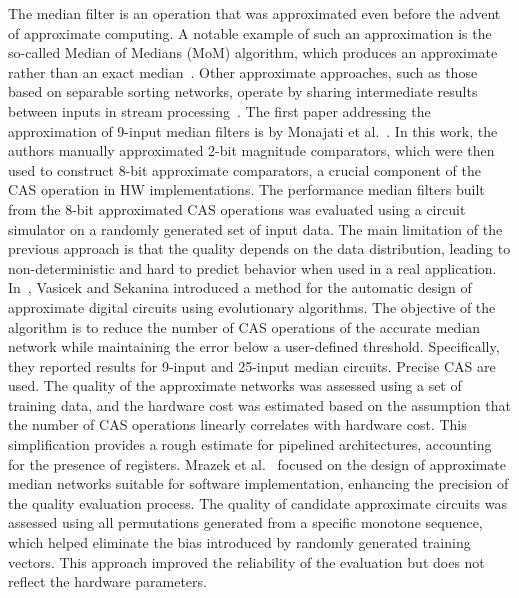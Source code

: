 The median filter is an operation that was approximated even before the advent of approximate computing. A notable example of such an approximation is the so-called Median of Medians (MoM) algorithm, which produces an approximate rather than an exact median~\cite{blum}. %
Other approximate approaches, such as those based on separable sorting networks, operate by sharing intermediate results between inputs in stream processing~\cite{Perrot2022, Adams, salvador18}.
The first paper addressing the approximation of 9-input median filters is by Monajati et al.~\cite{Monajati:2015}. In this work, the authors manually approximated 2-bit magnitude comparators, which were then used to construct 8-bit approximate comparators, a crucial component of the CAS operation in HW implementations. The performance median filters built from the 8-bit approximated CAS operations was evaluated using a circuit simulator on a randomly generated set of input data. 
The main limitation of the previous approach is that the quality depends on the data distribution, leading to non-deterministic and hard to predict behavior when used in a real application. In~\cite{vasicek:sekanina:tec}, Vasicek and Sekanina introduced a method for the automatic design of approximate digital circuits using evolutionary algorithms. The objective of the algorithm is to reduce the number of CAS operations of the accurate median network while maintaining the error below a user-defined threshold. Specifically, they reported results for 9-input and 25-input median circuits. Precise CAS are used. The quality of the approximate networks was assessed using a set of training data, and the hardware cost was estimated based on the assumption that the number of CAS operations linearly correlates with hardware cost. This simplification provides a rough estimate for pipelined architectures, accounting for the presence of registers.
Mrazek et al.~\cite{Vasicek2016} focused on the design of approximate median networks suitable for software implementation, enhancing the precision of the quality evaluation process. The quality of candidate approximate circuits was assessed using all permutations generated from a specific monotone sequence, which helped eliminate the bias introduced by randomly generated training vectors. This approach improved the reliability of the evaluation but does not reflect the hardware parameters. %

